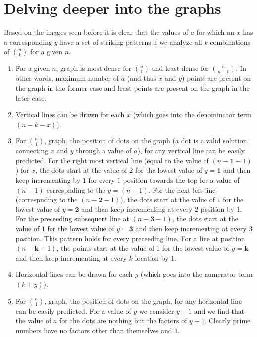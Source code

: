 \documentclass[10pt, twoside]{article}
\newcommand*{\Combination}[2]{\binom{#1}{#2}}%
\begin{document}
\section{Delving deeper into the graphs}\label{Implications}
Based on the images seen before it is clear that the values of $a$ for which an $x$ has a corresponding $y$ have a set of striking patterns if we analyze all $k$ combinations of $\Combination{n}{k}$ for a given $n$. 
\begin{enumerate}
	\item For a given $n$, graph is most dense for $\Combination{n}{1}$ and least dense for $\Combination{n}{n-1}$. In other words, maximum number of $a$ (and thus $x$ and $y$) points are present on the graph in the former case and least points are present on the graph in the later case.
	\item Vertical lines can be drawn for each $x$ (which goes into the denominator term $(n-k-x)$). 
	\item For $\Combination{n}{1}$, graph, the position of dots on the graph (a dot is a valid solution connecting $x$ and $y$ through a value of $a$), for any vertical line can be easily predicted. For the right most vertical line (equal to the value of $(n-\textbf{1}-1)$) for $x$, the dots start at the value of $2$ for the lowest value of $y=\textbf{1}$ and then keep incrementing by $1$ for every \textbf{$1$} position towards the top for a value of $(n-1)$ correspnding to the $y=(n-1)$. For the next left line (correspnding to the $(n-\textbf{2}-1)$), the dots start at the value of $1$ for the lowest value of $y=\textbf{2}$ and then keep incrementing at every \textbf{$2$} position by $1$. For the preceeding subsequent line at $(n-\textbf{3}-1)$, the dots start at the value of $1$ for the lowest value of $y=\textbf{3}$ and then keep incrementing at every \textbf{$3$} position. This pattern holds for every preceeding line. For a line at position $(n-\textbf{k}-1)$, the points start at the value of $1$ for the lowest value of $y=\textbf{k}$ and then keep incrementing at every \textbf{$k$} location by $1$.
	\item Horizontal lines can be drawn for each $y$ (which goes into the numerator term $(k+y)$).
	\item For $\Combination{n}{1}$, graph, the position of dots on the graph, for any horizontal line can be easily predicted. For a value of $y$ we consider $y+1$ and we find that the value of $a$ for the dots are nothing but the factors of $y+1$. Clearly prime numbers have no factors other than themselves and $1$.

\end{enumerate}
\end{document}
